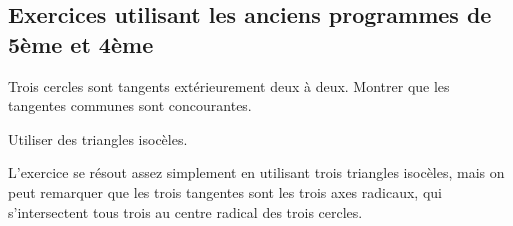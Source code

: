 \subsection{Exercices utilisant les anciens programmes de 5ème et 4ème}



\begin{exo} %


Trois cercles sont tangents extérieurement deux à deux. Montrer que les tangentes communes sont concourantes.

\begin{hint}   
Utiliser des triangles isocèles.
\end{hint}      
\begin{sol}  
L'exercice se résout assez simplement en utilisant trois triangles isocèles, mais on peut remarquer que les trois tangentes sont les trois axes radicaux, qui s'intersectent tous trois  au centre radical des trois cercles. 
\end{sol}  
\end{exo}  




